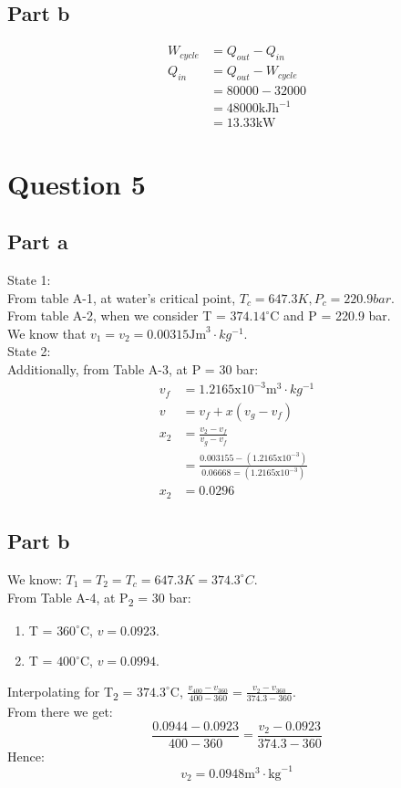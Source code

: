 \subsection{Part b}
\begin{equation*}
    \begin{split}
        W_{cycle} & = Q_{out} - Q_{in} \\
        Q_{in} & = Q_{out} - W_{cycle} \\
        & = 80000 - 32000 \\
        & = 48000 \text{kJh}^{-1} \\
        & = 13.33 \text{kW}
    \end{split}
\end{equation*}

\section{Question 5}
\subsection{Part a}
State 1: \\
From table A-1, at water's critical point, $T_c = 647.3K, P_c = 220.9bar$. \\
From table A-2, when we consider T = $374.14^\circ$C and P = 220.9 bar. \\
We know that $v_1 = v_2 = 0.00315\text{Jm}^3 \cdot kg^{-1}$. \\
State 2: \\
Additionally, from Table A-3, at P = 30 bar: \\
\begin{equation*}
    \begin{split}
        v_f & = 1.2165\text{x}10^{-3}\text{m}^3\cdot kg^{-1} \\
        v & = v_f + x(v_g - v_f) \\
        x_2 & = \frac{v_2 - v_f}{v_g - v_f} \\
        & = \frac{0.003155 - (1.2165\text{x}10^{-3})}{0.06668 = (1.2165\text{x}10^{-3})} \\
        x_2 & = 0.0296
    \end{split}
\end{equation*}
\subsection{Part b}
We know: $T_1 = T_2 = T_c = 647.3K = 374.3^\circ C$. \\
From Table A-4, at P\textsubscript{2} = 30 bar: \\
\begin{enumerate}
    \item T = $360^\circ$C, $v = 0.0923$.
    \item T = $400^\circ$C, $v = 0.0994$.
\end{enumerate}
Interpolating for T\textsubscript{2} = $374.3^\circ$C, $\frac{v_{400}-v_{360}}{400-360} = \frac{v_2 - v_{360}}{374.3-360}$. \\
From there we get: $$\frac{0.0944 - 0.0923}{400-360} = \frac{v_2 - 0.0923}{374.3 - 360}$$
Hence:
$$
v_2 = 0.0948\text{m}^3 \cdot \text{kg}^{-1}
$$

